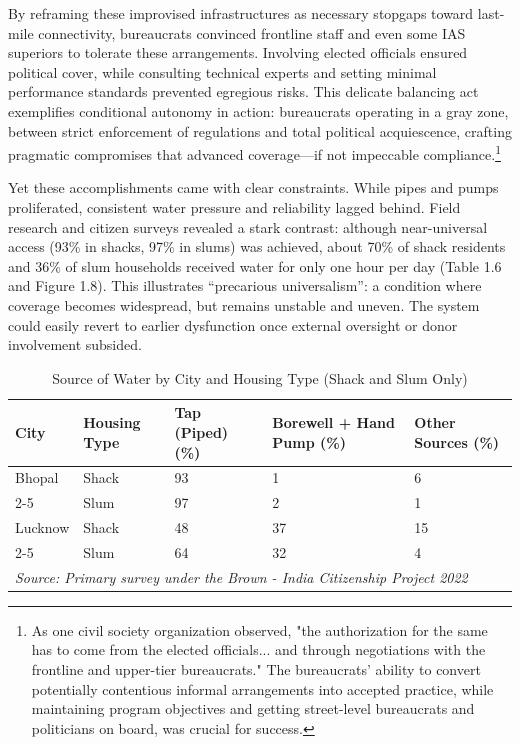 By reframing these improvised infrastructures as necessary stopgaps toward last-mile connectivity, bureaucrats convinced frontline staff and even some IAS superiors to tolerate these arrangements. Involving elected officials ensured political cover, while consulting technical experts and setting minimal performance standards prevented egregious risks. This delicate balancing act exemplifies conditional autonomy in action: bureaucrats operating in a gray zone, between strict enforcement of regulations and total political acquiescence, crafting pragmatic compromises that advanced coverage—if not impeccable compliance.\footnote{ As one civil society organization observed, "the authorization for the same has to come from the elected officials... and through negotiations with the frontline and upper-tier bureaucrats." The bureaucrats' ability to convert potentially contentious informal arrangements into accepted practice, while maintaining program objectives and getting street-level bureaucrats and politicians on board, was crucial for success.}
 

Yet these accomplishments came with clear constraints. While pipes and pumps proliferated, consistent water pressure and reliability lagged behind. Field research and citizen surveys revealed a stark contrast: although near-universal access (93\% in shacks, 97\% in slums) was achieved, about 70\% of shack residents and 36\% of slum households received water for only one hour per day (Table 1.6 and Figure 1.8). This illustrates “precarious universalism”: a condition where coverage becomes widespread, but remains unstable and uneven. The system could easily revert to earlier dysfunction once external oversight or donor involvement subsided.


\begin{table}[ht]
\centering
\renewcommand{\arraystretch}{1.3} %
\setlength{\tabcolsep}{5pt} %
\begin{tabular}{|p{3cm}|p{3cm}|p{3cm}|p{3cm}|p{3cm}|}
\hline
\textbf{City} & \textbf{Housing Type} & \textbf{Tap (Piped)} (\%) & \textbf{Borewell + Hand Pump} (\%) & \textbf{Other Sources} (\%) \\ \hline
Bhopal & Shack & 93 & 1 & 6 \\ \cline{2-5}
       & Slum  & 97 & 2 & 1 \\ \hline
Lucknow & Shack & 48 & 37 & 15 \\ \cline{2-5}
        & Slum  & 64 & 32 & 4 \\ \hline
\multicolumn{5}{l}{\textit{Source: Primary survey under the Brown - India Citizenship Project 2022}} \\ %
\end{tabular}

\caption{Source of Water by City and Housing Type (Shack and Slum Only)}
\label{tab:water_shack_slum}
\end{table}



